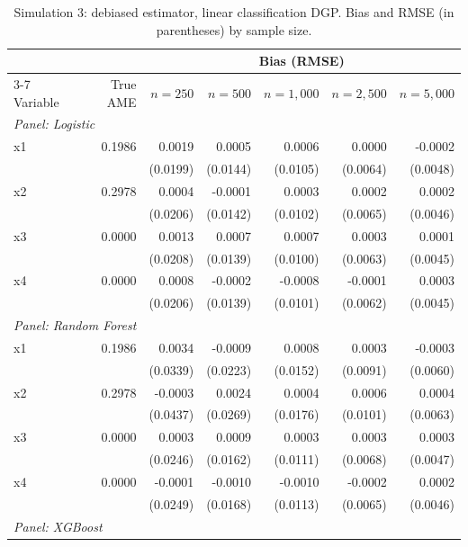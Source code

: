 \documentclass[12pt,a4paper]{article}
\numberwithin{equation}{section}
\theoremstyle{plain}
\theoremstyle{definition}
\begin{document}
	\begin{table}[htbp]
		\centering
		\small
		\begin{threeparttable}
			\caption{Simulation 3: debiased estimator, linear classification DGP. Bias and RMSE (in parentheses) by sample size.}
			\label{tab:sim3_bias_classification_linear}
			\begin{tabular}{lrrrrrr}
				\toprule
				& & \multicolumn{5}{c}{Bias (RMSE)} \\
				\cmidrule(lr){3-7}
				Variable & True AME & $n=250$ & $n=500$ & $n=1,000$ & $n=2,500$ & $n=5,000$ \\
				\midrule
				\multicolumn{7}{l}{\textit{Panel: Logistic}} \\
				\quad x1 & 0.1986 & 0.0019 & 0.0005 & 0.0006 & 0.0000 & -0.0002 \\
				&  & (0.0199) & (0.0144) & (0.0105) & (0.0064) & (0.0048) \\
				\quad x2 & 0.2978 & 0.0004 & -0.0001 & 0.0003 & 0.0002 & 0.0002 \\
				&  & (0.0206) & (0.0142) & (0.0102) & (0.0065) & (0.0046) \\
				\quad x3 & 0.0000 & 0.0013 & 0.0007 & 0.0007 & 0.0003 & 0.0001 \\
				&  & (0.0208) & (0.0139) & (0.0100) & (0.0063) & (0.0045) \\
				\quad x4 & 0.0000 & 0.0008 & -0.0002 & -0.0008 & -0.0001 & 0.0003 \\
				&  & (0.0206) & (0.0139) & (0.0101) & (0.0062) & (0.0045) \\
				\midrule
				\multicolumn{7}{l}{\textit{Panel: Random Forest}} \\
				\quad x1 & 0.1986 & 0.0034 & -0.0009 & 0.0008 & 0.0003 & -0.0003 \\
				&  & (0.0339) & (0.0223) & (0.0152) & (0.0091) & (0.0060) \\
				\quad x2 & 0.2978 & -0.0003 & 0.0024 & 0.0004 & 0.0006 & 0.0004 \\
				&  & (0.0437) & (0.0269) & (0.0176) & (0.0101) & (0.0063) \\
				\quad x3 & 0.0000 & 0.0003 & 0.0009 & 0.0003 & 0.0003 & 0.0003 \\
				&  & (0.0246) & (0.0162) & (0.0111) & (0.0068) & (0.0047) \\
				\quad x4 & 0.0000 & -0.0001 & -0.0010 & -0.0010 & -0.0002 & 0.0002 \\
				&  & (0.0249) & (0.0168) & (0.0113) & (0.0065) & (0.0046) \\
				\midrule
				\multicolumn{7}{l}{\textit{Panel: XGBoost}} \\

\end{tabular}
\end{threeparttable}
\end{table}
\end{document}
